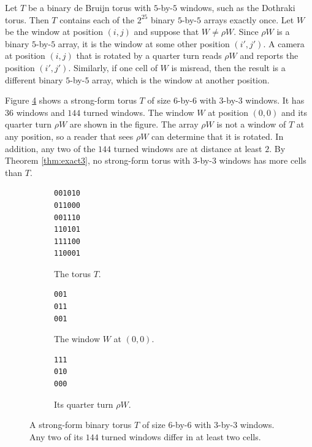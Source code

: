 \documentclass{lipics-v2021}
\begin{document}
\begin{example} \label{ex:debruijn}
Let $T$ be a binary de Bruijn torus with $5$-by-$5$ windows, such as the Dothraki torus.
Then $T$ contains each of the $2^{25}$ binary $5$-by-$5$ arrays exactly once.
Let $W$ be the window at position $(i,j)$ and suppose that $W \neq \rho W$.
Since $\rho W$ is a binary $5$-by-$5$ array, it is the window at some other position $(i',j')$.
A camera at position $(i,j)$ that is rotated by a quarter turn reads $\rho W$ and reports the position $(i',j')$.
Similarly, if one cell of $W$ is misread, then the result is a different binary $5$-by-$5$ array, which is the window at another position.
\end{example}

\begin{example} \label{ex:strong}
Figure \ref{fig:torus66} shows a strong-form torus $T$ of size $6$-by-$6$ with $3$-by-$3$ windows.
It has $36$ windows and $144$ turned windows.
The window $W$ at position $(0,0)$ and its quarter turn $\rho W$ are shown in the figure.
The array $\rho W$ is not a window of $T$ at any position, so a reader that sees $\rho W$ can determine that it is rotated.
In addition, any two of the $144$ turned windows are at distance at least $2$.
By Theorem \ref{thm:exact3}, no strong-form torus with $3$-by-$3$ windows has more cells than $T$.
\end{example}

\begin{figure}[htbp]
    \centering
    \begin{subfigure}{0.4\textwidth}
        \centering
\begin{verbatim}
001010
011000
001110
110101
111100
110001
\end{verbatim}
        \caption{The torus $T$.}
        \label{fig:torus66_text}
    \end{subfigure}
    \hfill
    \begin{subfigure}{0.25\textwidth}
        \centering
\begin{verbatim}
001
011
001
\end{verbatim}
        \caption{The window $W$ at $(0,0)$.}
        \label{fig:torus66_window}
    \end{subfigure}
    \hfill
    \begin{subfigure}{0.25\textwidth}
        \centering
\begin{verbatim}
111
010
000
\end{verbatim}
        \caption{Its quarter turn $\rho W$.}
        \label{fig:torus66_turn}
    \end{subfigure}
\caption{A strong-form binary torus $T$ of size $6$-by-$6$ with $3$-by-$3$ windows.
Any two of its $144$ turned windows differ in at least two cells.}
\label{fig:torus66}
\end{figure}
\end{document}
